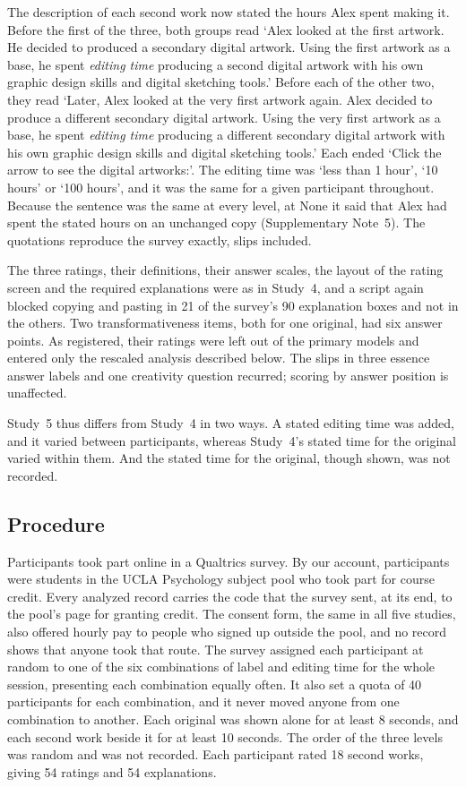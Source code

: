 The description of each second work now stated the hours Alex spent making it. Before the first of the three, both groups read `Alex looked at the first artwork. He decided to produced a secondary digital artwork. Using the first artwork as a base, he spent \textit{editing time} producing a second digital artwork with his own graphic design skills and digital sketching tools.' Before each of the other two, they read `Later, Alex looked at the very first artwork again. Alex decided to produce a different secondary digital artwork. Using the very first artwork as a base, he spent \textit{editing time} producing a different secondary digital artwork with his own graphic design skills and digital sketching tools.' Each ended `Click the arrow to see the digital artworks:'. The editing time was `less than 1 hour', `10 hours' or `100 hours', and it was the same for a given participant throughout. Because the sentence was the same at every level, at None it said that Alex had spent the stated hours on an unchanged copy (Supplementary Note~5). The quotations reproduce the survey exactly, slips included.

The three ratings, their definitions, their answer scales, the layout of the rating screen and the required explanations were as in Study~4, and a script again blocked copying and pasting in 21 of the survey's 90 explanation boxes and not in the others. Two transformativeness items, both for one original, had six answer points. As registered, their \SFiveNSixPointDropped{} ratings were left out of the primary models and entered only the rescaled analysis described below. The slips in three essence answer labels and one creativity question recurred; scoring by answer position is unaffected.

Study~5 thus differs from Study~4 in two ways. A stated editing time was added, and it varied between participants, whereas Study~4's stated time for the original varied within them. And the stated time for the original, though shown, was not recorded.

\subsection*{Procedure}

Participants took part online in a Qualtrics survey. By our account, participants were students in the UCLA Psychology subject pool who took part for course credit. Every analyzed record carries the code that the survey sent, at its end, to the pool's page for granting credit. The consent form, the same in all five studies, also offered hourly pay to people who signed up outside the pool, and no record shows that anyone took that route. The survey assigned each participant at random to one of the six combinations of label and editing time for the whole session, presenting each combination equally often. It also set a quota of 40 participants for each combination, and it never moved anyone from one combination to another. Each original was shown alone for at least 8 seconds, and each second work beside it for at least 10 seconds. The order of the three levels was random and was not recorded. Each participant rated 18 second works, giving 54 ratings and 54 explanations.

